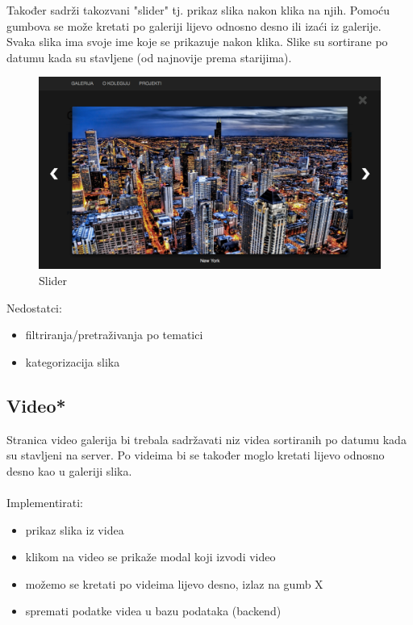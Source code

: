\documentclass[]{article}
\begin{document}
Također sadrži takozvani "slider" tj. prikaz slika nakon klika na njih. Pomoću gumbova se može kretati po galeriji lijevo odnosno desno ili izaći iz galerije. Svaka slika ima svoje ime koje se prikazuje nakon klika. Slike su sortirane po datumu kada su stavljene (od najnovije prema starijima).
\\
\begin{figure}[h]
	\centering
	\includegraphics[scale=0.23]{slider}
	\caption{Slider}
	\label{fig:mesh1}
\end{figure}

Nedostatci:
\begin{itemize}
	\item filtriranja/pretraživanja po tematici
	\item kategorizacija slika
\end{itemize}
\newpage
\subsection{Video*}
Stranica video galerija bi trebala sadržavati niz videa sortiranih po datumu kada su stavljeni na server. Po videima bi se također moglo kretati lijevo odnosno desno kao u galeriji slika.
\\
\\
Implementirati:
\begin{itemize}
	\item prikaz slika iz videa
	\item klikom na video se prikaže modal koji izvodi video
	\item možemo se kretati po videima lijevo desno, izlaz na gumb X
	\item spremati podatke videa u bazu podataka (backend)
\end{itemize}
\end{document}
